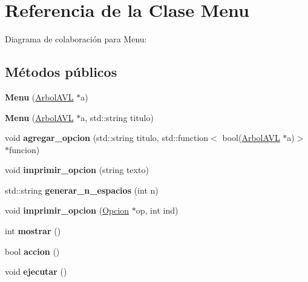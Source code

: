 \hypertarget{classMenu}{}\section{Referencia de la Clase Menu}
\label{classMenu}


Diagrama de colaboración para Menu\+:
\subsection*{Métodos públicos}
\begin{DoxyCompactItemize}
\item 
\mbox{\label{classMenu_a6d615b4b49c03a0cbfc2a01cfae8a64f}} 
{\bfseries Menu} (\hyperlink{classArbolAVL}{Arbol\+A\+VL} $\ast$a)
\item 
\mbox{\label{classMenu_ad673482d111ee4a4d918653df02369e3}} 
{\bfseries Menu} (\hyperlink{classArbolAVL}{Arbol\+A\+VL} $\ast$a, std\+::string titulo)
\item 
\mbox{\label{classMenu_a1e1f674058f3fd03a500859abda7dded}} 
void {\bfseries agregar\+\_\+opcion} (std\+::string titulo, std\+::function$<$ bool(\hyperlink{classArbolAVL}{Arbol\+A\+VL} $\ast$a)$>$ $\ast$funcion)
\item 
\mbox{\label{classMenu_aa964e3e58eb5c6b63ebadd7f2ec6751a}} 
void {\bfseries imprimir\+\_\+opcion} (string texto)
\item 
\mbox{\label{classMenu_a67ebd3e3bcfe45c99a7c0ff13a5c3ebb}} 
std\+::string {\bfseries generar\+\_\+n\+\_\+espacios} (int n)
\item 
\mbox{\label{classMenu_ab0d231cb7a3783451bd690612ff0f77a}} 
void {\bfseries imprimir\+\_\+opcion} (\hyperlink{classOpcion}{Opcion} $\ast$op, int ind)
\item 
\mbox{\label{classMenu_a909877f977f662803994c67e862b4b87}} 
int {\bfseries mostrar} ()
\item 
\mbox{\label{classMenu_ab5609ebe5415d2e5f06143819b832981}} 
bool {\bfseries accion} ()
\item 
\mbox{\label{classMenu_aa6be64bbaaaa59e535507d868cc9740f}} 
void {\bfseries ejecutar} ()
\end{DoxyCompactItemize}
